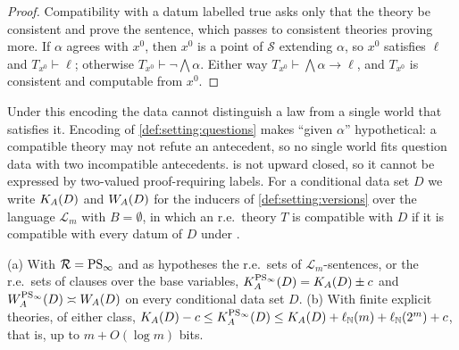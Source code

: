 \begin{proof}
Compatibility with a datum labelled true asks only that the theory be consistent and prove the sentence, which passes to consistent theories proving more. If $\alpha$ agrees with $x^0$, then $x^0$ is a point of $\mathcal S$ extending $\alpha$, so $x^0$ satisfies $\ell$ and $T_{x^0}\vdash\ell$; otherwise $T_{x^0}\vdash\neg\bigwedge\alpha$. Either way $T_{x^0}\vdash\bigwedge\alpha\to\ell$, and $T_{x^0}$ is consistent and computable from $x^0$.
\end{proof}

Under this encoding the data cannot distinguish a law from a single world that satisfies it. Encoding \Ethree{} of \cref{def:setting:questions} makes ``given $\alpha$'' hypothetical: a compatible theory may not refute an antecedent, so no single world fits question data with two incompatible antecedents. \Ethree{} is not upward closed, so it cannot be expressed by two-valued proof-requiring labels. For a conditional data set $D$ we write $K_{A}(D)$ and $W_{A}(D)$ for the inducers of \cref{def:setting:versions} over the language $\mathcal L_m$ with $B=\emptyset$, in which an r.e.\ theory $T$ is compatible with $D$ if it is compatible with every datum of $D$ under \Ethree.

\begin{proposition}\label{prop:shape:bridge}
(a) With $\mathcal R=\mathrm{PS}_\infty$ and as hypotheses the r.e.\ sets of $\mathcal L_m$-sentences, or the r.e.\ sets of clauses over the base variables, $K_{A}^{\mathrm{PS}_\infty}(D)=K_{A}(D)\pm c$ and $W_{A}^{\mathrm{PS}_\infty}(D)\asymp W_{A}(D)$ on every conditional data set $D$.
(b) With finite explicit theories, of either class, $K_{A}(D)-c\le K_{A}^{\mathrm{PS}_\infty}(D)\le K_{A}(D)+\ell_{\mathbb N}(m)+\ell_{\mathbb N}(2^m)+c$, that is, up to $m+O(\log m)$ bits.
\end{proposition}

